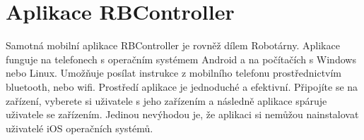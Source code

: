 \section{Aplikace RBController}
Samotná mobilní aplikace RBController je rovněž dílem Robotárny. Aplikace funguje na telefonech s operačním systémem Android a na počítačích s Windows nebo Linux. Umožňuje posílat instrukce z mobilního telefonu prostřednictvím bluetooth, nebo wifi. Prostředí aplikace je jednoduché a efektivní. Připojíte se na zařízení, vyberete si uživatele s jeho zařízením a následně aplikace spáruje uživatele se zařízením. Jedinou nevýhodou je, že aplikaci si nemůžou nainstalovat uživatelé iOS operačních systémů.  \cite{RBController}

